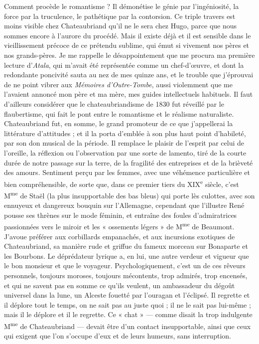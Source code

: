 \documentclass[french,twoside]{book} %
\begin{document}
Comment procède le romantisme ? Il démonétise le génie par l’ingéniosité, la force par la truculence, le pathétique par la contorsion. Ce triple travers est moins visible chez Chateaubriand qu’il ne le sera chez Hugo, parce que nous sommes encore à l’aurore du procédé. Mais il existe déjà et il est sensible dans le vieillissement précoce de ce prétendu sublime, qui émut si vivement nos pères et nos grands-pères. Je me rappelle le désappointement que me procura ma première lecture d’{\itshape Atala}, qui m’avait été représentée comme un chef-d’œuvre, et dont la redondante poncivité sauta au nez de mes quinze ans, et le trouble que j’éprouvai de ne point vibrer aux {\itshape Mémoires d’Outre-Tombe}, aussi violemment que me l’avaient annoncé mon père et ma mère, mes guides intellectuels habituels. Il faut d’ailleurs considérer que le chateaubriandisme de 1830 fut réveillé par le flaubertisme, qui fait le pont entre le romantisme et le réalisme naturaliste. Chateaubriand fut, en somme, le grand promoteur de ce que j’appellerai la littérature d’attitudes ; et il la porta d’emblée à son plus haut point d’habileté, par son don musical de la période. Il remplace le plaisir de l’esprit par celui de l’oreille, la réflexion ou l’observation par une sorte de lamento, tiré de la courte durée de notre passage sur la terre, de la fragilité des entreprises et de la brièveté des amours. Sentiment perçu par les femmes, avec une véhémence particulière et bien compréhensible, de sorte que, dans ce premier tiers du XIX\textsuperscript{e} siècle, c’est M\textsuperscript{me} de Staël (la plus insupportable des bas bleus) qui porte lès culottes, avec son ennuyeux et dangereux bouquin sur l’Allemagne, cependant que l’illustre René pousse ses thrènes sur le mode féminin, et entraîne des foules d’admiratrices passionnées vers le miroir et les « ossements légers » de M\textsuperscript{me} de Beaumont. J’avoue préférer aux corbillards empanachés, et aux incursions exotiques de Chateaubriand, sa manière rude et griffue du fameux morceau sur Bonaparte et les Bourbons. Le déprédateur lyrique a, en lui, une autre verdeur et vigueur que le bon monsieur et que le voyageur. Psychologiquement, c’est un de ces rêveurs personnels, toujours moroses, toujours mécontents, trop admirés, trop encensés, et qui ne savent pas en somme ce qu’ils veulent, un ambassadeur du dégoût universel dans la lune, un Alceste fouetté par l’ouragan et l’éclipsé. Il regrette et il déplore tout le temps, on ne sait pas au juste quoi ; il ne le sait pas lui-même ; mais il le déplore et il le regrette. Ce « chat » — comme disait la trop indulgente M\textsuperscript{me} de Chateaubriand — devait être d’un contact insupportable, ainsi que ceux qui exigent que l’on s’occupe d’eux et de leurs humeurs, sans interruption.\par
\end{document}
